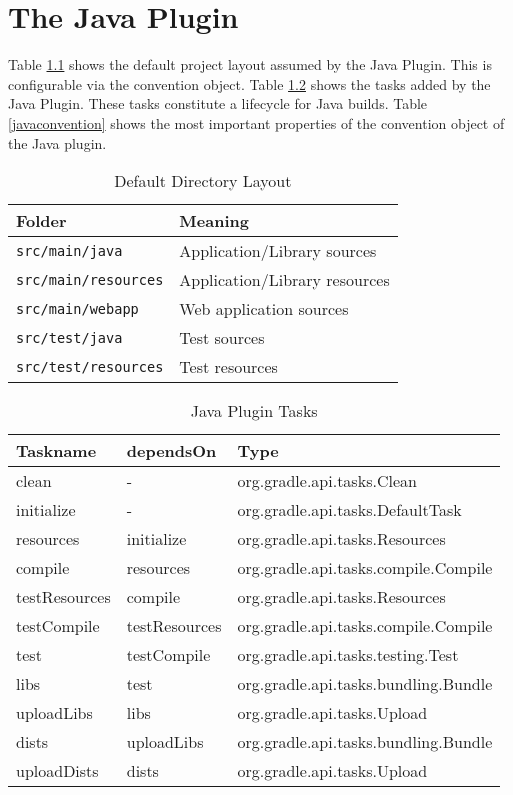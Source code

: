 \chapter{The Java Plugin} %
\label{cha:the_java_plugin}
Table \ref{javalayout} shows the default project layout assumed by the Java Plugin. This is configurable via the convention object. Table \ref{javatasks} shows the tasks added by the Java Plugin. These tasks constitute a lifecycle for Java builds. Table \ref{javaconvention} shows the most important properties of the convention object of the Java plugin.

\begin{table}[h]
	\begin{center}
	\begin{tabular}{|l|l|} \hline
	\textbf{Folder} & \textbf{Meaning} \\ \hline
	\texttt{src/main/java} & Application/Library sources \\ \hline
	\texttt{src/main/resources} & Application/Library resources \\ \hline
	\texttt{src/main/webapp} & Web application sources \\ \hline
	\texttt{src/test/java} & Test sources \\ \hline
	\texttt{src/test/resources} & Test resources \\ \hline
	\end{tabular}
	\end{center}
	\caption{Default Directory Layout}	
	\label{javalayout}
\end{table}

\begin{table}[h]
	\begin{center}
		\begin{tabular}{|l|l|l|} \hline
			\textbf{Taskname} & \textbf{dependsOn} & \textbf{Type} \\ \hline
			clean & - & org.gradle.api.tasks.Clean \\ \hline
			initialize & - & org.gradle.api.tasks.DefaultTask \\ \hline
			resources & initialize & org.gradle.api.tasks.Resources \\ \hline
			compile & resources & org.gradle.api.tasks.compile.Compile \\ \hline
			testResources & compile & org.gradle.api.tasks.Resources \\ \hline
			testCompile & testResources & org.gradle.api.tasks.compile.Compile \\ \hline
			test & testCompile & org.gradle.api.tasks.testing.Test \\ \hline
			libs & test & org.gradle.api.tasks.bundling.Bundle \\ \hline
			uploadLibs & libs & org.gradle.api.tasks.Upload \\ \hline
			dists & uploadLibs & org.gradle.api.tasks.bundling.Bundle \\ \hline
			uploadDists & dists & org.gradle.api.tasks.Upload \\ \hline
		\end{tabular}
	\end{center}
	\caption{Java Plugin Tasks}	
	\label{javatasks}
\end{table}

